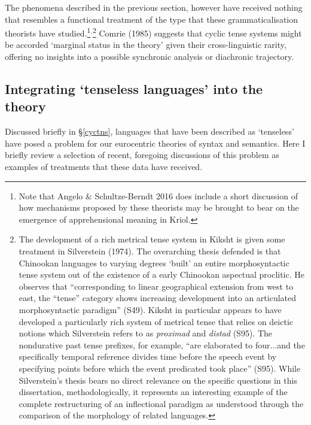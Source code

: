 \documentclass[12pt]{article}
\begin{document}
The phenomena described in the previous section, however have received nothing that resembles a functional treatment of the type that these grammaticalisation theorists have studied.\footnote{Note that Angelo \& Schultze-Berndt 2016 does include a short discussion of how mechanisms proposed by these theorists may be brought to bear on the emergence of apprehensional meaning in Kriol.}$^\text{,}$\footnote{The development of a rich metrical tense system in Kiksht is given some treatment in Silverstein (1974). The overarching thesis defended is that Chinookan languages to varying degrees `built' an entire morphosyntactic tense system out of the existence of a early Chinookan aspectual proclitic. He observes that ``corresponding to linear geographical extension from west to east, the ``tense'' category shows increasing development into an articulated morphosyntactic paradigm'' (S49). Kiksht in particular appears to have developed a particularly rich system of metrical tense that relies on deictic notions which Silverstein refers to as \textit{proximad} and \textit{distad} (S95). The nondurative past tense prefixes, for example, ``are elaborated to four...and the specifically temporal reference divides time before the speech event by specifying points before which the event predicated took place'' (S95). While Silverstein's thesis bears no direct relevance on the specific questions in this dissertation, methodologically, it represents an interesting example of the complete restructuring of an inflectional paradigm as understood through the comparison of the morphology of related languages.}
Comrie (1985) suggests that cyclic tense systems might be accorded `marginal status in the theory' given their cross-linguistic rarity, offering no insights into a possible synchronic analysis or diachronic trajectory.




\subsection{Integrating `tenseless languages' into the theory}\label{tenseless}

Discussed briefly in §\ref{cyctns}, languages that have been described as `tenseless' have posed a problem for our eurocentric theories of syntax and semantics. Here I briefly review a selection of recent, foregoing discussions of this problem as examples of treatments that these data have received.
\end{document}
